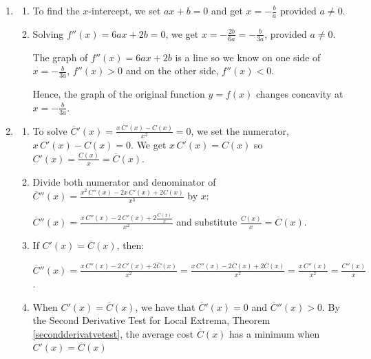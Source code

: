 \documentclass{ximera}
\begin{document}
\begin{enumerate}
\setcounter{enumi}{\value{HW}}

\item  \begin{enumerate}  \item To find the $x$-intercept, we set $ax+b = 0$  and get $x = -\frac{b}{a}$ provided $a \neq 0$.

\item  Solving  $f''(x) = 6ax + 2b = 0$, we get $x = -\frac{2b}{6a} = - \frac{b}{3a}$, provided $a \neq 0$.  

\smallskip

The graph of $f''(x) =  6ax + 2b$ is a line so we know on one side of $x= - \frac{b}{3a}$, $f''(x) > 0$ and on the other side, $f''(x) < 0$.  

\smallskip

Hence, the graph of the original function $y = f(x)$ changes concavity at $x = -\frac{b}{3a}$.

\end{enumerate}

\item\begin{enumerate}  \item  To solve $\overline{C}'(x) = \frac{x \, C'(x) - C(x)}{x^2} = 0$, we set the numerator,  $x \, C'(x) - C(x) = 0$. We get  $x \, C'(x)  = C(x)$ so $C'(x) = \frac{C(x)}{x} = \overline{C}(x)$.

\smallskip

\item  Divide both numerator and denominator of  $\overline{C}''(x) = \frac{x^2 \, C''(x) - 2x\, C'(x) + 2C(x)}{x^3}$ by $x$: 

\smallskip

$\overline{C}''(x) = \frac{x \, C''(x) - 2 \, C'(x) + 2\frac{C(x)}{x}}{x^2}$ and substitute  $\frac{C(x)}{x} = \overline{C}(x)$.

\smallskip

\item  If  $C'(x) = \overline{C}(x)$, then:

\smallskip

 $\overline{C}''(x)  = \frac{x\, C''(x) - 2\, C'(x) + 2\overline{C}(x)}{x^2} =  \frac{x\, C''(x) - 2\overline{C} (x) + 2\overline{C}(x)}{x^2}= \frac{x\, C''(x)}{x^2} =  \frac{C''(x)}{x}$.

\smallskip

\item  When $C'(x) = \overline{C}(x)$, we have that $\overline{C}'(x) = 0$ and $\overline{C}''(x) > 0$.  By the Second Derivative Test for Local Extrema,  Theorem \ref{secondderivatvetest}, the average cost $\overline{C}(x)$ has a minimum when $C'(x) = \overline{C}(x)$ 


\end{enumerate}
\end{enumerate}
\end{document}
